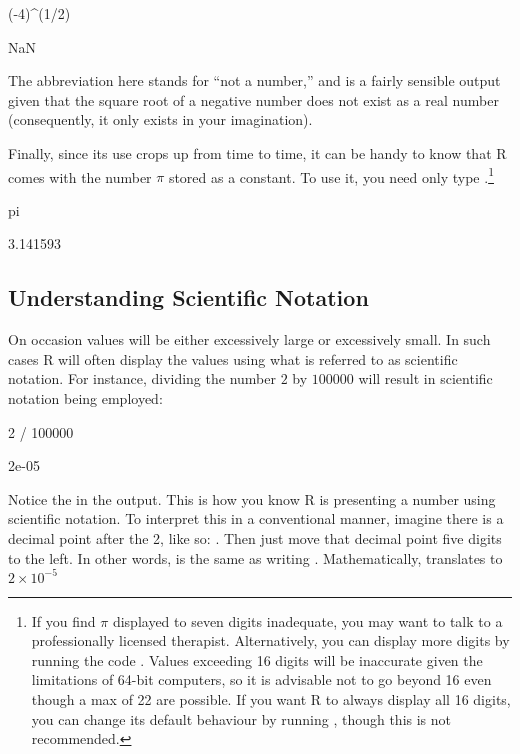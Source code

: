 \begin{inR}
(-4)^(1/2)
\end{inR}
\begin{outR}
[1] NaN
\end{outR}

The abbreviation  here stands for ``not a number,'' and is a fairly sensible output given that the square root of a negative number does not exist as a real number (consequently, it only exists in your imagination).

Finally, since its use crops up from time to time, it can be handy to know that R comes with the number $\pi$ stored as a constant. To use it, you need only type .\footnote{If you find $\pi$ displayed to seven digits inadequate, you may want to talk to a professionally licensed therapist. Alternatively, you can display more digits by running the code . Values exceeding 16 digits will be inaccurate given the limitations of 64-bit computers, so it is advisable not to go beyond 16 even though a max of 22 are possible. If you want R to always display all 16 digits, you can change its default behaviour by running , though this is not recommended.}

\begin{inR}
pi
\end{inR}
\begin{outR}
[1] 3.141593
\end{outR}

\subsection{Understanding Scientific Notation}

On occasion values will be either excessively large or excessively small. In such cases R will often display the values using what is referred to as \gls{scientific notation}.  For instance, dividing the number $2$ by $100000$ will result in scientific notation being employed:

\begin{inR}
2 / 100000
\end{inR}
\begin{outR}
[1] 2e-05
\end{outR}

Notice the  in the output. This is how you know R is presenting a number using scientific notation. To interpret this in a conventional manner, imagine there is a decimal point after the 2, like so: . Then just move that decimal point five digits to the left. In other words,  is the same as writing . Mathematically,  translates to $2 \times 10^{-5}$

